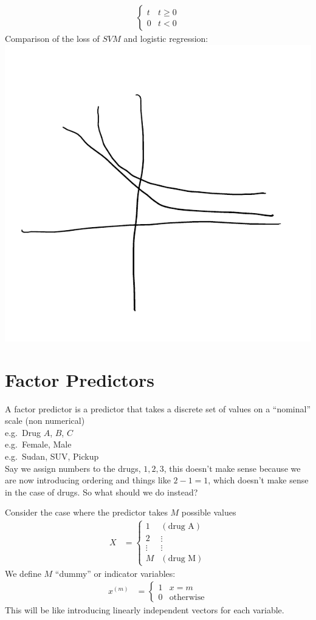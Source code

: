 \documentclass[12 pt]{article}
\begin{document}
\begin{enumerate}
\begin{align*}
\begin{cases}
                     t & t \geq 0
                     \\ 0 & t < 0
                   \end{cases}
    \end{align*}
    Comparison of the loss of $SVM$ and logistic regression:\\
    \includegraphics[width=.4\textwidth]{38.pdf}
  \end{enumerate}
  \section{Factor Predictors}
  A factor predictor is a predictor that takes a discrete set of
  values on a ``nominal'' scale (non numerical)
  \\ e.g.\ Drug $A$, $B$, $C$
  \\ e.g.\ Female, Male
  \\ e.g.\ Sudan, SUV, Pickup
  \\ Say we assign numbers to the drugs, $1,2,3$, this doesn't make
  sense because we are now introducing ordering and things like $2 - 1
  = 1$, which doesn't make sense in the case of drugs. So what should
  we do instead?

  Consider the case where the predictor takes $M$ possible values
  \begin{align*}
    X & =
        \begin{cases}
          1 & (\text{drug A})\\2 & \vdots\\\vdots & \vdots\\M &
          (\text{drug M})
        \end{cases}
  \end{align*}
  We define $M$ ``dummy'' or indicator variables:
  \begin{align*}
    x^{(m)} & =
          \begin{cases}
            1 & x = m
            \\0 & \text{otherwise}
          \end{cases}
  \end{align*}
  This will be like introducing linearly independent vectors for each
  variable.
\end{document}
